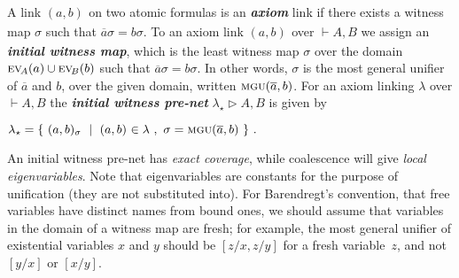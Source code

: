 \documentclass[UKenglish]{lipics-v2019}
\makeatletter
\newcommand\defn[1]{\textit{\textbf{#1}}}
\newcommand\ex[2][{}]{\textsc{ev}_{#1}(#2)}
\newcommand\+{+}
\renewcommand\*{\times}
\newcommand\dual[1]{\overline{#1}}
\newcommand\seq[2]{{\vdash}#1,#2}
\newcommand\Seq{\vphantom(\seq}
\newcommand\Prf[3]{\deduce{\Seq{#2}{#3}}{\vphantom(#1}}
\newcommand\net[3]{#1\triangleright #2,#3}
\newcommand\mgu{\textsc{mgu}}
\newcommand\coh{\smallfrown}
\newcommand\join{\vee}
\newcommand\init[2]{\mgu(#1,#2)}
\newcommand\link[3][\sigma]{(#2,#3)_{#1}}
\newcommand\ucoal{\rightsquigarrow}
\newcommand\srr[1]{
  \ifx#1+\expandafter\@srr\else
  \ifx#1*\*\mathrm S\else
  \ifx#1!\forall\mathrm S\else
  \ifx#1?\exists\mathrm S\else 
  \ifx#11\mathrm{axS}\else
  #1\mathrm S  \fi\fi\fi\fi\fi
}
\newcommand\@srr[1]{+\mathrm S,{#1}}
\newcommand\urr[1]{
  \ifx#1+\expandafter\@urr\else
  \ifx#1*\*\mathrm U\else
  \ifx#1!\forall\mathrm U\else
  \ifx#1?\exists\mathrm U\else 
  \ifx#11\mathrm{axU}\else
  #1\mathrm U
  \fi\fi\fi\fi\fi
}
\newcommand\@urr[1]{+\mathrm U,{#1}}
\makeatother
\begin{document}
A link $\link[]ab$ on two atomic formulas is an \defn{axiom} link if there exists a witness map $\sigma$ such that $\dual a\sigma=b\sigma$. To an axiom link $\link[]ab$ over $\seq AB$ we assign an \defn{initial witness map}, which is the least witness map $\sigma$ over the domain $\ex[\!A]a\cup\ex[\!B]b$ such that $\dual a\sigma=b\sigma$. In other words, $\sigma$ is the most general unifier of $\dual a$ and $b$, over the given domain, written $\init{\dual a}b$. For an axiom linking $\lambda$ over $\seq AB$ the \defn{initial witness pre-net} $\net{\lambda_\star}AB$ is given by
\begin{center}\(
	\lambda_\star = \{~\link ab~\mid~\link[]ab\in\lambda~,~\sigma=\init{\dual a}b~\}~.
\)\end{center}
An initial witness pre-net has \emph{exact coverage}, while coalescence will give \emph{local eigenvariables}. Note that eigenvariables are constants for the purpose of unification (they are not substituted into). For Barendregt's convention, that free variables have distinct names from bound ones, we should assume that variables in the domain of a witness map are fresh; for example, the most general unifier of existential variables $x$ and $y$ should be $[z/x,z/y]$ for a fresh variable~$z$, and not $[y/x]$ or $[x/y]$.



\end{document}
